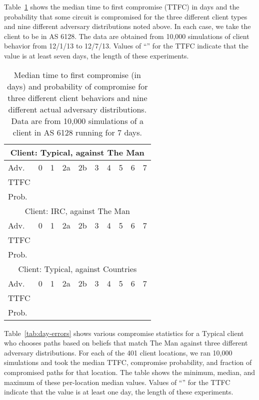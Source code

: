 \documentclass[conference]{styles/IEEEtran}
\begin{document}
Table~\ref{tab:weeklong-errors} shows the median time to first compromise (TTFC) in days and the probability that some circuit is compromised for the three different client types and nine different adversary distributions noted above.  In each case, we take the client to be in AS 6128.  The data are obtained from 10,000 simulations of client behavior from 12/1/13 to 12/7/13.  Values of ``'' for the TTFC indicate that the value is at least seven days, the length of these experiments.


\begin{table}
\begin{center}
\begin{tabular}{|l|c|c|c|c|c|c|c|c|c|}\hline
\multicolumn{10}{|c|}{Client: Typical, against \textsf{The Man}}\\ \hline
Adv. & 0 & 1 & 2a & 2b & 3 & 4 & 5 & 6 & 7 \\ \hline
TTFC &  &  &  &  &  &  &  &  &    \\ \hline
Prob. &  &  &  &  &  &  &  &  &    \\ \hline\hline
\multicolumn{10}{|c|}{Client: IRC, against \textsf{The Man}}\\ \hline
Adv. & 0 & 1 & 2a & 2b & 3 & 4 & 5 & 6 & 7 \\ \hline
TTFC &  &  &  &  &  &  &  &  &   \\ \hline
Prob. &  &  &  &  &  &  &  &  &    \\ \hline\hline
\multicolumn{10}{|c|}{Client: Typical, against \textsf{Countries}}\\ \hline
Adv. & 0 & 1 & 2a & 2b & 3 & 4 & 5 & 6 & 7 \\ \hline
TTFC &  &  &  &  &  &  &  &  &    \\ \hline
Prob. &  &  &  &  &  &  &  &  &    \\ 
\hline \end{tabular}
\end{center}
\vspace{-2mm}
\caption{\small Median time to first compromise (in days) and probability of compromise for three different client behaviors and nine different actual adversary distributions.  Data are from 10,000 simulations of a client in AS 6128 running for 7 days.}\label{tab:weeklong-errors}
\vspace{-4mm}
\end{table}

Table~\ref{tab:day-errors} shows various compromise statistics for a Typical client who chooses paths based on beliefs that match \textsf{The Man} against three different adversary distributions.  For each of the 401 client locations, we ran 10,000 simulations and took the median TTFC, compromise probability, and fraction of compromised paths for that location.  The table shows the minimum, median, and maximum of these per-location median values.  Values of ``'' for the TTFC indicate that the value is at least one day, the length of these experiments.
\end{document}
